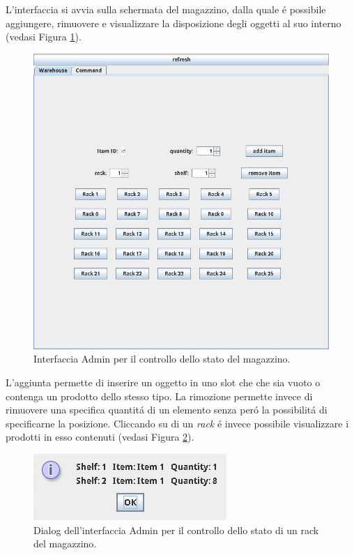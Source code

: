 L'interfaccia si avvia sulla schermata del magazzino, dalla quale \'e possibile aggiungere, rimuovere e visualizzare la disposizione degli oggetti al suo interno (vedasi Figura \ref{fig:application-warehouse}).
\begin{figure}[!ht]\centering
    \includegraphics[width=.75\textwidth]{section/usage_examples/figure/application-warehouse.png}
    \caption{Interfaccia Admin per il controllo dello stato del magazzino.}
    \label{fig:application-warehouse}
\end{figure}
L'aggiunta permette di inserire un oggetto in uno slot che che sia vuoto o contenga un prodotto dello stesso tipo. La rimozione permette invece di rimuovere una specifica quantit\'a di un elemento senza per\'o la possibilit\'a di specificarne la posizione.
Cliccando su di un \textit{rack} \'e invece possibile visualizzare i prodotti in esso contenuti (vedasi Figura \ref{fig:application-rack}).
\begin{figure}[!ht]\centering
    \includegraphics[width=.75\textwidth]{section/usage_examples/figure/application-rack.png}
    \caption{Dialog dell'interfaccia Admin per il controllo dello stato di un rack del magazzino.}
    \label{fig:application-rack}
\end{figure}

